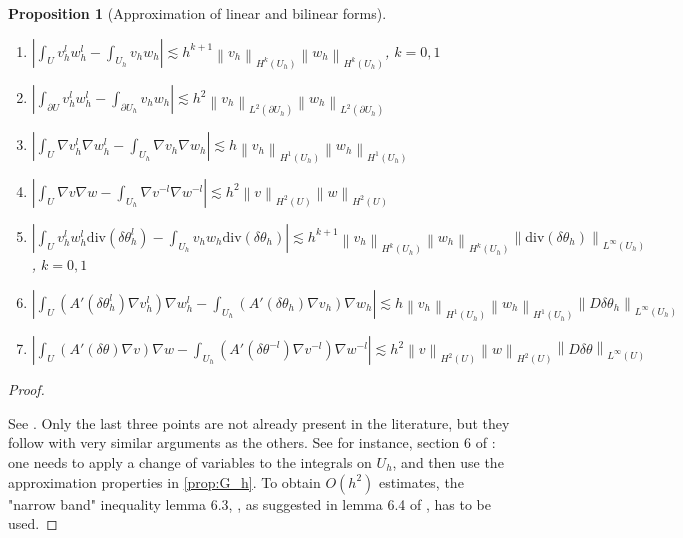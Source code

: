 \documentclass[english,a4paper,9pt,oneside]{scrbook}	%
\theoremstyle{break}
\newtheorem{prop}[equation]{Proposition}
\newenvironment{mproof}[1][\proofname]{%
  \begin{proof}[#1]$ $\par\nobreak\ignorespaces
}{%
  \end{proof}
}
\renewcommand*{\proofname}{Proof}
\theoremstyle{remark}
\newcommand{\ds}{\displaystyle}
\newcommand{\norm}[1]{\left\lVert#1\right\rVert}
\newcommand{\te}{\theta}
\newcommand{\dive}{\text{div}}
\begin{document}
\begin{appendices}
\begin{prop}[Approximation of linear and bilinear forms]
\begin{enumerate}
	\item $\ds \left | \int_U v_h^lw_h^l - \int_{U_h}v_hw_h\right |\lesssim h^{k+1} \norm{v_h}_{H^k(U_h)}\norm{w_h}_{H^k(U_h)}$, $k=0,1$
	\item $\ds \left | \int_{\partial U} v_h^lw_h^l - \int_{\partial U_h}v_hw_h\right |\lesssim h^2 \norm{v_h}_{L^2(\partial U_h)}\norm{w_h}_{L^2(\partial U_h)}$
	\item $\ds \left | \int_U \nabla v_h^l\nabla w_h^l - \int_{U_h}\nabla v_h\nabla w_h\right |\lesssim h \norm{v_h}_{H^1(U_h)}\norm{w_h}_{H^1(U_h)}$
	\item $\ds \left | \int_U \nabla v\nabla w - \int_{U_h}\nabla v^{-l}\nabla w^{-l}\right |\lesssim h^2 \norm{v}_{H^2(U)}\norm{w}_{H^2(U)}$
	\item $\ds \left | \int_U v_h^l w_h^l \dive(\delta  \te_h^l) - \int_{U_h}v_h w_h \dive(\delta \te_h)\right |\lesssim h^{k+1} \norm{v_h}_{H^k(U_h)}\norm{w_h}_{H^k(U_h)} \norm{\dive(\delta \te_h)}_{L^\infty(U_h)}$, $k=0,1$
	\item $\ds \left | \int_U (A'(\delta	\te_h^l)\nabla v_h^l)\nabla w_h^l - \int_{U_h}(A'(\delta	\te_h)\nabla v_h)\nabla w_h\right |\lesssim h \norm{v_h}_{H^1(U_h)}\norm{w_h}_{H^1(U_h)}\norm{D\delta \te_h}_{L^\infty(U_h)}$
	\item $\ds \left | \int_U (A'(\delta	\te)\nabla v)\nabla w - \int_{U_h}(A'(\delta	\te^{-l})\nabla v^{-l})\nabla w^{-l}\right |\lesssim h^2 \norm{v}_{H^2(U)}\norm{w}_{H^2(U)}\norm{D\delta \te}_{L^\infty(U)}$
\end{enumerate}
\end{prop}

\begin{mproof}
See \cite{edelmann}. Only the last three points are not already present in the literature, but they follow with very similar arguments as the others. See for instance, section 6 of \cite{elliott}: one needs to apply a change of variables to the integrals on $U_h$, and then use the approximation properties in \cref{prop:G_h}. To obtain $O(h^2)$ estimates, the "narrow band" inequality lemma 6.3, \cite{elliott}, as suggested in  lemma 6.4 of \cite{elliott}, has to be used.


\end{mproof}
\end{appendices}
\end{document}
